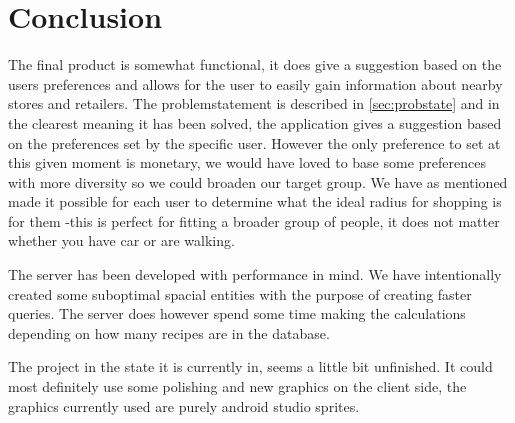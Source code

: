 \chapter{Conclusion}
\label{chap:conc}

The final product is somewhat functional, it does give a suggestion based on the users preferences and allows for the user to easily gain information about nearby stores and retailers. The problemstatement is described in \ref{sec:probstate} and in the clearest meaning it has been solved, the application gives a suggestion based on the preferences set by the specific user. However the only preference to set at this given moment is monetary, we would have loved to base some preferences with more diversity so we could broaden our target group. We have as mentioned made it possible for each user to determine what the ideal radius for shopping is for them -this is perfect for fitting a broader group of people, it does not matter whether you have car or are walking.

The server has been developed with performance in mind. We have intentionally created some suboptimal spacial entities with the purpose of creating faster queries. The server does however spend some time making the calculations depending on how many recipes are in the database. 

The project in the state it is currently in, seems a little bit unfinished. It could most definitely use some polishing and new graphics on the client side, the graphics currently used are purely android studio sprites. 




